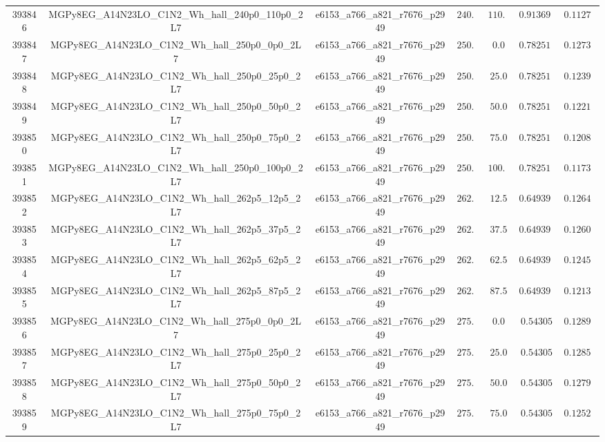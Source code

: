 \begin{table}[htbp]
\begin{center}
{\begin{tabular}{ccccccc}
393846 & MGPy8EG\_A14N23LO\_C1N2\_Wh\_hall\_240p0\_110p0\_2L7 & e6153\_a766\_a821\_r7676\_p2949 & $240.0$ & $110.0$ & $0.913692  $ & $0.11273$ \\
393847 & MGPy8EG\_A14N23LO\_C1N2\_Wh\_hall\_250p0\_0p0\_2L7   & e6153\_a766\_a821\_r7676\_p2949 & $250.0$ & $0.0  $ & $0.782514  $ & $0.12732$ \\
393848 & MGPy8EG\_A14N23LO\_C1N2\_Wh\_hall\_250p0\_25p0\_2L7  & e6153\_a766\_a821\_r7676\_p2949 & $250.0$ & $25.0 $ & $0.782514  $ & $0.12395$ \\
393849 & MGPy8EG\_A14N23LO\_C1N2\_Wh\_hall\_250p0\_50p0\_2L7  & e6153\_a766\_a821\_r7676\_p2949 & $250.0$ & $50.0 $ & $0.782514  $ & $0.12211$ \\
393850 & MGPy8EG\_A14N23LO\_C1N2\_Wh\_hall\_250p0\_75p0\_2L7  & e6153\_a766\_a821\_r7676\_p2949 & $250.0$ & $75.0 $ & $0.782514  $ & $0.12087$ \\
393851 & MGPy8EG\_A14N23LO\_C1N2\_Wh\_hall\_250p0\_100p0\_2L7 & e6153\_a766\_a821\_r7676\_p2949 & $250.0$ & $100.0$ & $0.782514  $ & $0.11736$ \\
393852 & MGPy8EG\_A14N23LO\_C1N2\_Wh\_hall\_262p5\_12p5\_2L7  & e6153\_a766\_a821\_r7676\_p2949 & $262.5$ & $12.5 $ & $0.649397  $ & $0.12647$ \\
393853 & MGPy8EG\_A14N23LO\_C1N2\_Wh\_hall\_262p5\_37p5\_2L7  & e6153\_a766\_a821\_r7676\_p2949 & $262.5$ & $37.5 $ & $0.649397  $ & $0.12603$ \\
393854 & MGPy8EG\_A14N23LO\_C1N2\_Wh\_hall\_262p5\_62p5\_2L7  & e6153\_a766\_a821\_r7676\_p2949 & $262.5$ & $62.5 $ & $0.649397  $ & $0.12457$ \\
393855 & MGPy8EG\_A14N23LO\_C1N2\_Wh\_hall\_262p5\_87p5\_2L7  & e6153\_a766\_a821\_r7676\_p2949 & $262.5$ & $87.5 $ & $0.649397  $ & $0.12131$ \\
393856 & MGPy8EG\_A14N23LO\_C1N2\_Wh\_hall\_275p0\_0p0\_2L7   & e6153\_a766\_a821\_r7676\_p2949 & $275.0$ & $0.0  $ & $0.54305   $ & $0.12896$ \\
393857 & MGPy8EG\_A14N23LO\_C1N2\_Wh\_hall\_275p0\_25p0\_2L7  & e6153\_a766\_a821\_r7676\_p2949 & $275.0$ & $25.0 $ & $0.54305   $ & $0.12850$ \\
393858 & MGPy8EG\_A14N23LO\_C1N2\_Wh\_hall\_275p0\_50p0\_2L7  & e6153\_a766\_a821\_r7676\_p2949 & $275.0$ & $50.0 $ & $0.54305   $ & $0.12794$ \\
393859 & MGPy8EG\_A14N23LO\_C1N2\_Wh\_hall\_275p0\_75p0\_2L7  & e6153\_a766\_a821\_r7676\_p2949 & $275.0$ & $75.0 $ & $0.54305   $ & $0.12526$ \\

\end{tabular}}
\end{center}
\end{table}
